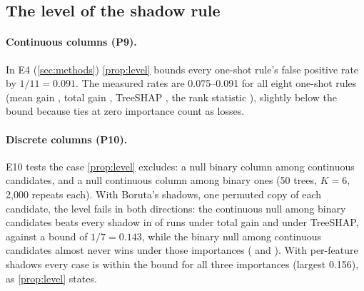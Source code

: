\subsection{The level of the shadow rule}\label{sec:exp-level}

\paragraph{Continuous columns (P9).} In E4 (\cref{sec:methods}) \cref{prop:level} bounds every one-shot rule's false positive rate by $1/11 = 0.091$. The measured rates are 0.075--0.091 for all eight one-shot rules (mean gain \numPnineoneshotgain, total gain \numPnineoneshottotalgain, TreeSHAP \numPnineoneshotshap, the rank statistic \numPninemwushadowmax), slightly below the bound because ties at zero importance count as losses.

\paragraph{Discrete columns (P10).} E10 tests the case \cref{prop:level} excludes: a null binary column among continuous candidates, and a null continuous column among binary ones (50 trees, $K = 6$, 2{,}000 repeats each). With Boruta's shadows, one permuted copy of each candidate, the level fails in both directions: the continuous null among binary candidates beats every shadow in \numPtenborutacontinuousnullamongbinarytotalgain{} of runs under total gain and \numPtenborutacontinuousnullamongbinaryshap{} under TreeSHAP, against a bound of $1/7 = 0.143$, while the binary null among continuous candidates almost never wins under those importances (\numPtenborutabinarynulltotalgain{} and \numPtenborutabinarynullshap). With per-feature shadows every case is within the bound for all three importances (largest 0.156), as \cref{prop:level} states.
